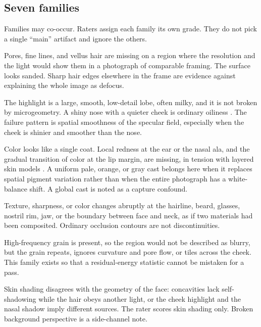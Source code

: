 \documentclass[10pt,twocolumn]{article}
\begin{document}
\subsection{Seven families}

Families may co-occur. Raters assign each family its own grade. They do not pick a single ``main'' artifact and ignore the others.

\begin{description}[style=nextline,leftmargin=1.4em,itemsep=2pt,topsep=2pt]
  \item[F1. Mesostructure erasure.]
  Pores, fine lines, and vellus hair are missing on a region where the resolution and the light would show them in a photograph of comparable framing. The surface looks sanded. Sharp hair edges elsewhere in the frame are evidence against explaining the whole image as defocus.
  \item[F2. Plastic specular lobe.]
  The highlight is a large, smooth, low-detail lobe, often milky, and it is not broken by microgeometry. A shiny nose with a quieter cheek is ordinary oiliness \cite{weyrich2006}. The failure pattern is spatial smoothness of the specular field, especially when the cheek is shinier and smoother than the nose.
  \item[F3. Subsurface and chromophore flattening.]
  Color looks like a single coat. Local redness at the ear or the nasal ala, and the gradual transition of color at the lip margin, are missing, in tension with layered skin models \cite{donner2008,igarashi2007}. A uniform pale, orange, or gray cast belongs here when it replaces spatial pigment variation rather than when the entire photograph has a white-balance shift. A global cast is noted as a capture confound.
  \item[F4. Boundary discontinuity.]
  Texture, sharpness, or color changes abruptly at the hairline, beard, glasses, nostril rim, jaw, or the boundary between face and neck, as if two materials had been composited. Ordinary occlusion contours are not discontinuities.
  \item[F5. Stamped or replicated texture.]
  High-frequency grain is present, so the region would not be described as blurry, but the grain repeats, ignores curvature and pore flow, or tiles across the cheek. This family exists so that a residual-energy statistic cannot be mistaken for a pass.
  \item[F6. Geometry-insensitive illumination.]
  Skin shading disagrees with the geometry of the face: concavities lack self-shadowing while the hair obeys another light, or the cheek highlight and the nasal shadow imply different sources. The rater scores skin shading only. Broken background perspective is a side-channel note.

\end{description}
\end{document}
